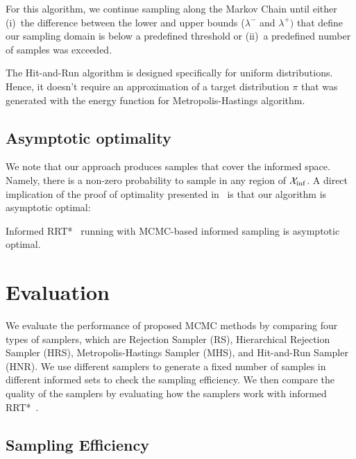 \documentclass[letterpaper, 10 pt, conference]{ieeeconf}  %
\begin{document}
For this algorithm, we continue sampling along the Markov Chain until either 
(i)~the difference between the lower and upper bounds ($\lambda^-$ and $\lambda^+)$ 
that define our sampling domain is below a predefined threshold or
(ii)~a predefined number of samples was exceeded.

The Hit-and-Run algorithm is designed specifically for uniform distributions. 
Hence, it doesn't require an approximation of a target distribution $ \pi $ that was generated with the energy function for Metropolis-Hastings algorithm.

\subsection{Asymptotic optimality}
We note that our approach produces samples that cover the informed space. Namely, there is a non-zero probability to sample in any region of $\mathcal{X}_{\rm {inf}}$.
A direct implication of the proof of optimality presented in~\cite{KF11} is that our algorithm is asymptotic optimal:

\begin{prop}
	\label{prop:asym_opt}
	Informed RRT*~\cite{GSB14} running with MCMC-based informed sampling is asymptotic optimal.	
\end{prop}

\section{Evaluation}
\label{sec:eval}

We evaluate the performance of proposed MCMC methods by comparing four types of samplers, which are Rejection Sampler (RS), Hierarchical Rejection Sampler (HRS), Metropolis-Hastings Sampler (MHS), and Hit-and-Run Sampler (HNR).
We use different samplers to generate a fixed number of samples in different informed sets to check the sampling efficiency. %
We then compare the quality of the samplers by evaluating how the samplers work with informed RRT*~\cite{GSB14}.

\subsection{Sampling Efficiency}

\end{document}
